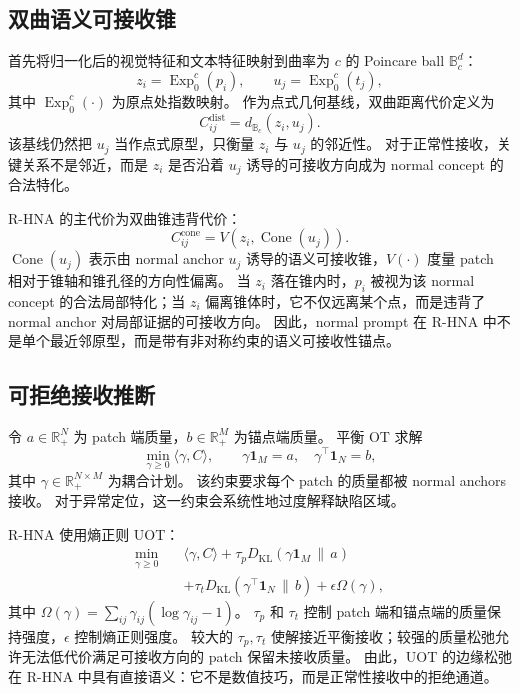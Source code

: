 \documentclass[UTF8,fontset=none,10pt]{ctexart}
\newcommand{\method}{R-HNA}
\begin{document}
\subsection{双曲语义可接收锥}

首先将归一化后的视觉特征和文本特征映射到曲率为 $c$ 的 Poincare ball $\mathbb{B}_{c}^{d}$：
\begin{equation}
    z_i = \operatorname{Exp}^{c}_{0}(p_i), \qquad
    u_j = \operatorname{Exp}^{c}_{0}(t_j),
\end{equation}
其中 $\operatorname{Exp}^{c}_{0}(\cdot)$ 为原点处指数映射。
作为点式几何基线，双曲距离代价定义为
\begin{equation}
    C_{ij}^{\mathrm{dist}} = d_{\mathbb{B}_{c}}(z_i, u_j).
\end{equation}
该基线仍然把 $u_j$ 当作点式原型，只衡量 $z_i$ 与 $u_j$ 的邻近性。
对于正常性接收，关键关系不是邻近，而是 $z_i$ 是否沿着 $u_j$ 诱导的可接收方向成为 normal concept 的合法特化。

\method{} 的主代价为双曲锥违背代价：
\begin{equation}
    C_{ij}^{\mathrm{cone}} =
    V\!\left(z_i, \operatorname{Cone}(u_j)\right).
\end{equation}
$\operatorname{Cone}(u_j)$ 表示由 normal anchor $u_j$ 诱导的语义可接收锥，$V(\cdot)$ 度量 patch 相对于锥轴和锥孔径的方向性偏离。
当 $z_i$ 落在锥内时，$p_i$ 被视为该 normal concept 的合法局部特化；当 $z_i$ 偏离锥体时，它不仅远离某个点，而是违背了 normal anchor 对局部证据的可接收方向。
因此，normal prompt 在 \method{} 中不是单个最近邻原型，而是带有非对称约束的语义可接收性锚点。

\subsection{可拒绝接收推断}

令 $a \in \mathbb{R}_{+}^{N}$ 为 patch 端质量，$b \in \mathbb{R}_{+}^{M}$ 为锚点端质量。
平衡 OT 求解
\begin{equation}
    \min_{\gamma \geq 0} \langle \gamma, C \rangle,
    \qquad
    \gamma \mathbf{1}_{M}=a,\quad
    \gamma^{\top}\mathbf{1}_{N}=b,
\end{equation}
其中 $\gamma \in \mathbb{R}_{+}^{N \times M}$ 为耦合计划。
该约束要求每个 patch 的质量都被 normal anchors 接收。
对于异常定位，这一约束会系统性地过度解释缺陷区域。

\method{} 使用熵正则 UOT：
\begin{equation}
\begin{split}
    \min_{\gamma \geq 0} \quad
    &\langle \gamma, C \rangle
    + \tau_{p} D_{\mathrm{KL}}(\gamma \mathbf{1}_{M} \,\|\, a) \\
    &+ \tau_{t} D_{\mathrm{KL}}(\gamma^{\top}\mathbf{1}_{N} \,\|\, b)
    + \epsilon \Omega(\gamma),
\end{split}
\label{eq:uot}
\end{equation}
其中 $\Omega(\gamma)=\sum_{ij}\gamma_{ij}(\log \gamma_{ij}-1)$。
$\tau_p$ 和 $\tau_t$ 控制 patch 端和锚点端的质量保持强度，$\epsilon$ 控制熵正则强度。
较大的 $\tau_p,\tau_t$ 使解接近平衡接收；较强的质量松弛允许无法低代价满足可接收方向的 patch 保留未接收质量。
由此，UOT 的边缘松弛在 \method{} 中具有直接语义：它不是数值技巧，而是正常性接收中的拒绝通道。
\end{document}
